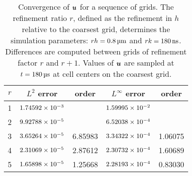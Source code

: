 \begin{table}[tb]
    \centering
    \caption[Convergence of fluid velocities for relaxing RBC test]{%
Convergence of $\boldsymbol{u}$ for a sequence of grids. The refinement ratio $r$, defined as the refinement in $h$ relative
to the coarsest grid, determines the simulation parameters: $rh = 0.8\um$ and $r\timestep = 180\ns$. Differences are
computed between grids of refinement factor $r$ and $r+1$. Values of $\boldsymbol{u}$ are sampled at $t = 180\us$ at cell
centers on the coarsest grid.
    }\label{tab:u-rbc-conv}
    \begingroup
    \setlength{\tabcolsep}{9pt}
    \renewcommand{\arraystretch}{1.5}
    \begin{tabular}{c|cc|cc}
                                                                                     \toprule
        $r$ & $L^2$ error            & order   & $L^\infty$ error       & order   \\ \midrule
        1   & ${1.74592}\times 10^{-3}$ &         & ${1.59995}\times 10^{-2}$ &         \\
        2   & ${9.92788}\times 10^{-5}$ &         & ${6.52038}\times 10^{-4}$ &         \\
        3   & ${3.65264}\times 10^{-5}$ & 6.85983 & ${3.34322}\times 10^{-4}$ & 1.06075 \\
        4   & ${2.31069}\times 10^{-5}$ & 2.87612 & ${2.30732}\times 10^{-4}$ & 1.60689 \\
        5   & ${1.65898}\times 10^{-5}$ & 1.25668 & ${2.28193}\times 10^{-4}$ & 0.83030 \\ \bottomrule
    \end{tabular}
    \endgroup
\end{table}

